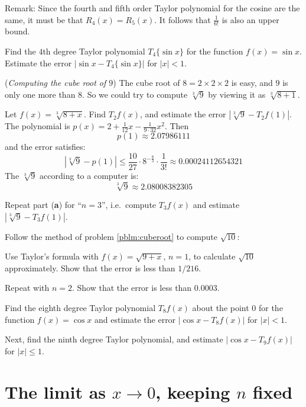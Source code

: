 Remark: Since the fourth and fifth order Taylor polynomial for
the cosine are the same, it must be that $R_4(x)=R_5(x)$.
It follows that $\frac{1}{6!}$ is also an upper bound.
\endanswer

\problem Find the $4$th degree Taylor polynomial $T_4\{\sin x\}$ for the %
function $f(x)=\sin x$.  Estimate the error $|\sin x-T_4\{\sin x\}|$ for
$|x|<1$.



\problem \label{pblm:cuberoot}(\textit{Computing the cube root of $9$}) %
The cube root of $8 =2\times2\times2$ is easy, and $9$ is only one more
than $8$. So we  could try to compute $\sqrt[3]9$ by viewing it as
$\sqrt[3]{8+1}$.

\subprob  Let $f(x)=\sqrt[3]{8+x}$.  Find $T_2f(x)$, and estimate the error
$|\sqrt[3]{9}-T_2f(1)|$.
\answer %
The polynomial is $p(x)=2+\frac1{12}x-\frac1{9\cdot 32}x^2$.
Then
\[
  p(1)\approx 2.07986111
\]
and the error satisfies:
\[
  |\sqrt[3]9-p(1)|\leq \frac{10}{27}\cdot8^{-\frac83}\cdot\frac1{3!}
  \approx 0.00024112654321
\]
The $\sqrt[3]{9}$ according to a computer is:
\[
  \sqrt[3]{9}\approx 2.08008382305
\]
\endanswer


\subprob Repeat part (\textbf{a}) for ``$n=3$'', i.e.~compute
$T_3f(x)$ and estimate $ |\sqrt[3]{9}-T_3f(1)| $.




\problem %
Follow the method of problem \ref{pblm:cuberoot} to compute $\sqrt{10}$:

\subprob Use Taylor's formula with $f(x)=\sqrt{9+x}$, $n=1$, to calculate
$\sqrt{10}$ approximately. Show that the error is less than $1/216$.

\subprob Repeat with $n=2$. Show that the error is less than $0.0003$.


\problem Find the eighth degree Taylor polynomial $T_8f(x)$ about the %
point $0$ for the function $f(x)=\cos x$ and estimate the error $|\cos
x-T_8f(x)|$ for $|x|<1$.

Next, find the ninth degree Taylor polynomial, and estimate $|\cos x -
T_9f(x)|$ for $|x|\leq 1$.


\noproblemfont

\section{The limit as $x\to0$, keeping $n$ fixed } %

